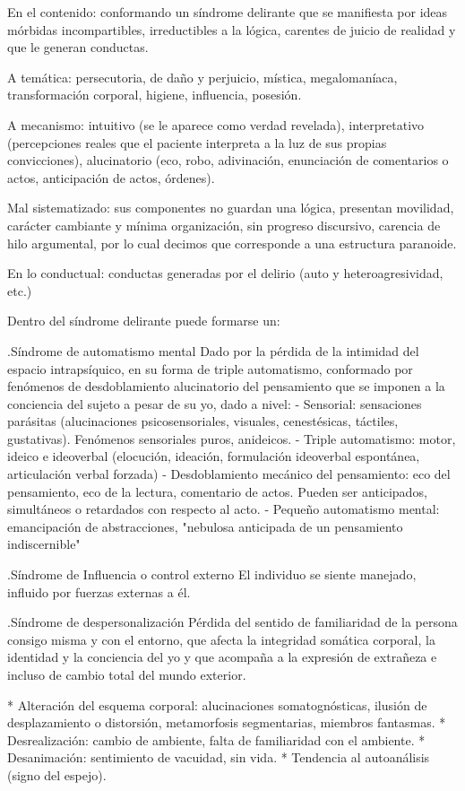 En el contenido: conformando un síndrome delirante que se manifiesta por ideas mórbidas incompartibles, irreductibles a la lógica, carentes de juicio de realidad y que le generan conductas.

A temática: persecutoria, de daño y perjuicio, mística, megalomaníaca, transformación corporal, higiene, influencia, posesión.

A mecanismo: intuitivo (se le aparece como verdad revelada), interpretativo (percepciones reales que el paciente interpreta a la luz de sus propias convicciones), alucinatorio (eco, robo, adivinación, enunciación de comentarios o actos, anticipación de actos, órdenes).

Mal sistematizado: sus componentes no guardan una lógica, presentan movilidad, carácter cambiante y mínima organización, sin progreso discursivo, carencia de hilo argumental, por lo cual decimos que corresponde a una estructura paranoide.

En lo conductual: conductas generadas por el delirio (auto y heteroagresividad, etc.)

Dentro del síndrome delirante puede formarse un:

.Síndrome de automatismo mental
Dado por la pérdida de la intimidad del espacio intrapsíquico, en su forma de triple automatismo, conformado por fenómenos de desdoblamiento alucinatorio del pensamiento que se imponen a la conciencia del sujeto a pesar de su yo, dado a nivel:
- Sensorial: sensaciones parásitas (alucinaciones psicosensoriales, visuales, cenestésicas, táctiles, gustativas). Fenómenos sensoriales puros, anideicos.
- Triple automatismo: motor, ideico e ideoverbal (elocución, ideación, formulación ideoverbal espontánea, articulación verbal forzada)
- Desdoblamiento mecánico del pensamiento: eco del pensamiento, eco de la lectura, comentario de actos. Pueden ser anticipados, simultáneos o retardados con respecto al acto.
- Pequeño automatismo mental: emancipación de abstracciones, "nebulosa anticipada de un pensamiento indiscernible"

.Síndrome de Influencia o control externo
El individuo se siente manejado, influido por fuerzas externas a él.

.Síndrome de despersonalización
Pérdida del sentido de familiaridad de la persona consigo misma y con el entorno, que afecta la integridad somática corporal, la identidad y la conciencia del yo y que acompaña a la expresión de extrañeza e incluso de cambio total del mundo exterior.

* Alteración del esquema corporal: alucinaciones somatognósticas, ilusión de desplazamiento o distorsión, metamorfosis segmentarias, miembros fantasmas.
* Desrealización: cambio de ambiente, falta de familiaridad con el ambiente.
* Desanimación: sentimiento de vacuidad, sin vida.
* Tendencia al autoanálisis (signo del espejo).

